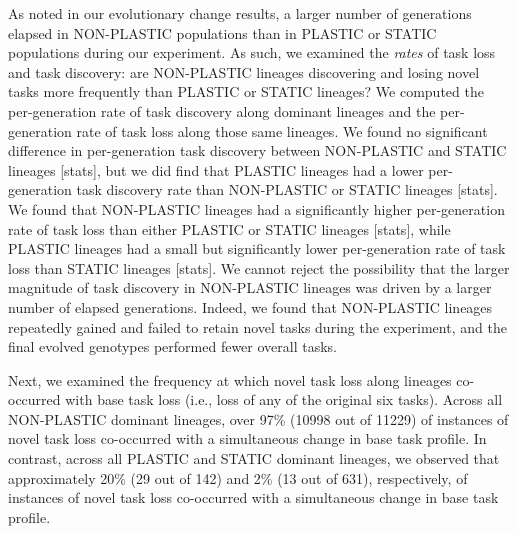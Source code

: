 As noted in our evolutionary change results, a larger number of generations elapsed in NON-PLASTIC populations than in PLASTIC or STATIC populations during our experiment.
As such, we examined the \textit{rates} of task loss and task discovery: are NON-PLASTIC lineages discovering and losing novel tasks more frequently than PLASTIC or STATIC lineages?
We computed the per-generation rate of task discovery along dominant lineages and the per-generation rate of task loss along those same lineages.
We found no significant difference in per-generation task discovery between NON-PLASTIC and STATIC lineages [stats], but we did find that PLASTIC lineages had a lower per-generation task discovery rate than NON-PLASTIC or STATIC lineages [stats].
We found that NON-PLASTIC lineages had a significantly higher per-generation rate of task loss than either PLASTIC or STATIC lineages [stats], while PLASTIC lineages had a small but significantly lower per-generation rate of task loss than STATIC lineages [stats].
We cannot reject the possibility that the larger magnitude of task discovery in NON-PLASTIC lineages was driven by a larger number of elapsed generations.
Indeed, we found that NON-PLASTIC lineages repeatedly gained and failed to retain novel tasks during the experiment, and the final evolved genotypes performed fewer overall tasks.

Next, we examined the frequency at which novel task loss along lineages co-occurred with base task loss (i.e., loss of any of the original six tasks).
Across all NON-PLASTIC dominant lineages, over 97\% (10998 out of 11229) of instances of novel task loss co-occurred with a simultaneous change in base task profile.
In contrast, across all PLASTIC and STATIC dominant lineages, we observed that approximately 20\% (29 out of 142) and 2\% (13 out of 631), respectively, of instances of novel task loss co-occurred with a simultaneous change in base task profile. 

\vspace{0.5cm}
